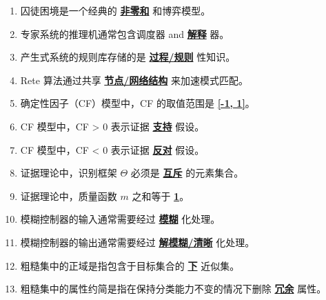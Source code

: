 \documentclass[12pt,a4paper,openany]{ctexbook}
\begin{document}
\begin{enumerate}[resume,leftmargin=2em,itemsep=1pt]
\item 囚徒困境是一个经典的 \underline{\textbf{非零和}} 和博弈模型。
\item 专家系统的推理机通常包含调度器 and \underline{\textbf{解释}} 器。
\item 产生式系统的规则库存储的是 \underline{\textbf{过程/规则}} 性知识。
\item Rete 算法通过共享 \underline{\textbf{节点/网络结构}} 来加速模式匹配。
\item 确定性因子（CF）模型中，CF 的取值范围是 \underline{\textbf{[-1, 1]}}。
\item CF 模型中，CF > 0 表示证据 \underline{\textbf{支持}} 假设。
\item CF 模型中，CF < 0 表示证据 \underline{\textbf{反对}} 假设。
\item 证据理论中，识别框架 $\Theta$ 必须是 \underline{\textbf{互斥}} 的元素集合。
\item 证据理论中，质量函数 $m$ 之和等于 \underline{\textbf{1}}。
\item 模糊控制器的输入通常需要经过 \underline{\textbf{模糊}} 化处理。
\item 模糊控制器的输出通常需要经过 \underline{\textbf{解模糊/清晰}} 化处理。
\item 粗糙集中的正域是指包含于目标集合的 \underline{\textbf{下}} 近似集。
\item 粗糙集中的属性约简是指在保持分类能力不变的情况下删除 \underline{\textbf{冗余}} 属性。
\end{enumerate}
\end{document}
